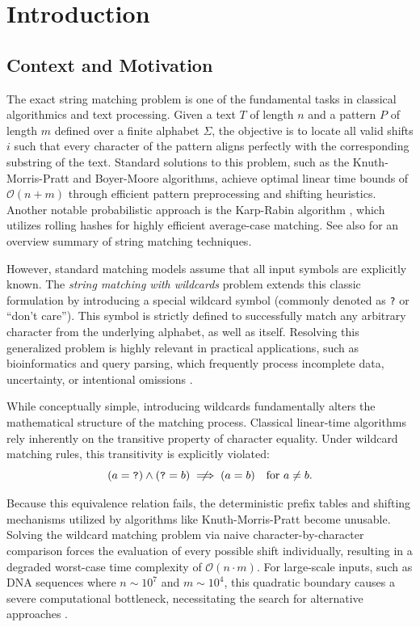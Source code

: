 \chapter{Introduction}

\section{Context and Motivation}
The exact string matching problem is one of the fundamental tasks in classical algorithmics and text processing. Given a text $T$ of length $n$ and a pattern $P$ of length $m$ defined over a finite alphabet $\Sigma$, the objective is to locate all valid shifts $i$ such that every character of the pattern aligns perfectly with the corresponding substring of the text. Standard solutions to this problem, such as the Knuth-Morris-Pratt \cite{kmp1977} and Boyer-Moore \cite{bm1977} algorithms, achieve optimal linear time bounds of $\mathcal{O}(n + m)$ through efficient pattern preprocessing and shifting heuristics. Another notable probabilistic approach is the Karp-Rabin algorithm \cite{karp1987efficient}, which utilizes rolling hashes for highly efficient average-case matching. See also \cite{aho1990} for an overview summary of string matching techniques.

However, standard matching models assume that all input symbols are explicitly known. The \textit{string matching with wildcards} problem extends this classic formulation by introducing a special wildcard symbol (commonly denoted as \texttt{?} or ``don't care''). This symbol is strictly defined to successfully match any arbitrary character from the underlying alphabet, as well as itself. Resolving this generalized problem is highly relevant in practical applications, such as bioinformatics and query parsing, which frequently process incomplete data, uncertainty, or intentional omissions \cite{mp1994}.

While conceptually simple, introducing wildcards fundamentally alters the mathematical structure of the matching process. Classical linear-time algorithms rely inherently on the transitive property of character equality. Under wildcard matching rules, this transitivity is explicitly violated:
\begin{equation}
    (a = \text{\texttt{?}}) \land (\text{\texttt{?}} = b) \centernot\implies (a = b) \quad \text{for } a \neq b.
\end{equation}

Because this equivalence relation fails, the deterministic prefix tables and shifting mechanisms utilized by algorithms like Knuth-Morris-Pratt become unusable. Solving the wildcard matching problem via naive character-by-character comparison forces the evaluation of every possible shift individually, resulting in a degraded worst-case time complexity of $\mathcal{O}(n \cdot m)$. For large-scale inputs, such as DNA sequences where $n \sim 10^7$ and $m \sim 10^4$, this quadratic boundary causes a severe computational bottleneck, necessitating the search for alternative approaches \cite{fp1974}.

